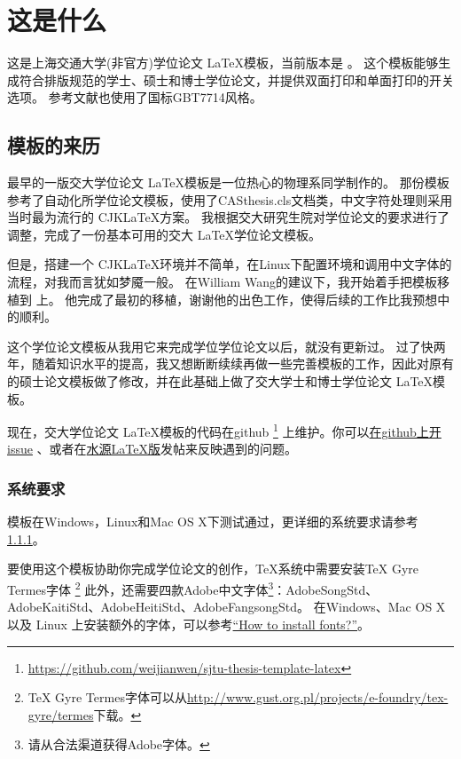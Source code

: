 
\chapter{这是什么}
\label{chap:what}

这是上海交通大学(非官方)学位论文 \LaTeX 模板，当前版本是 \version 。
这个模板能够生成符合排版规范的学士、硕士和博士学位论文，并提供双面打印和单面打印的开关选项。
参考文献也使用了国标GBT7714风格。

\section{模板的来历}

最早的一版交大学位论文 \LaTeX 模板是一位热心的物理系同学制作的。
那份模板参考了自动化所学位论文模板，使用了CASthesis.cls文档类，中文字符处理则采用当时最为流行的 CJK\LaTeX 方案。
我根据交大研究生院对学位论文的要求进行了调整，完成了一份基本可用的交大 \LaTeX 学位论文模板。

但是，搭建一个 CJK\LaTeX 环境并不简单，在Linux下配置环境和调用中文字体的流程，对我而言犹如梦魇一般。
在William Wang的建议下，我开始着手把模板移植到 \XeTeX 上。
他完成了最初的移植，谢谢他的出色工作，使得后续的工作比我预想中的顺利。

这个学位论文模板从我用它来完成学位学位论文以后，就没有更新过。
过了快两年，随着知识水平的提高，我又想断断续续再做一些完善模板的工作，因此对原有的硕士论文模板做了修改，并在此基础上做了交大学士和博士学位论文 \LaTeX 模板。

现在，交大学位论文 \LaTeX 模板的代码在github
\footnote{\url{https://github.com/weijianwen/sjtu-thesis-template-latex}}
上维护。你可以\href{https://github.com/weijianwen/sjtu-thesis-template-latex/issues}{在github上开issue}
、或者在\href{https://bbs.sjtu.edu.cn/bbsdoc?board=TeX_LaTeX}{水源LaTeX版}发帖来反映遇到的问题。

\subsection{系统要求}
\label{sec:requirements}

模板在Windows，Linux和Mac OS X下测试通过，更详细的系统要求请参考\ref{sec:requirements}。

要使用这个模板协助你完成学位论文的创作，TeX系统中需要安装TeX Gyre Termes字体
\footnote{TeX Gyre Termes字体可以从\href{http://www.gust.org.pl/projects/e-foundry/tex-gyre/termes}{http://www.gust.org.pl/projects/e-foundry/tex-gyre/termes}下载。}
此外，还需要四款Adobe中文字体\footnote{请从合法渠道获得Adobe字体。}：AdobeSongStd、AdobeKaitiStd、AdobeHeitiStd、AdobeFangsongStd。
在Windows、Mac OS X 以及 Linux 上安装额外的字体，可以参考\href{https://www.searchfreefonts.com/articles/how-to-install-fonts.htm}{“How to install fonts?”}。

